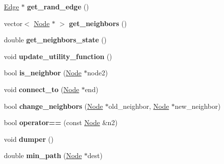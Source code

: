 \begin{DoxyCompactItemize}
\item 
\hypertarget{classNode_ad82b8e548dbe9ac08da97d91cfcd5504}{}\hyperlink{classEdge}{Edge} $\ast$ {\bfseries get\+\_\+rand\+\_\+edge} ()\label{classNode_ad82b8e548dbe9ac08da97d91cfcd5504}

\item 
\hypertarget{classNode_a66879b4a454db6b9ae77eb6a2d00f838}{}vector$<$ \hyperlink{classNode}{Node} $\ast$ $>$ {\bfseries get\+\_\+neighbors} ()\label{classNode_a66879b4a454db6b9ae77eb6a2d00f838}

\item 
\hypertarget{classNode_aac4cc347fc2c7e0ab05e6d5238e11c92}{}double {\bfseries get\+\_\+neighbors\+\_\+state} ()\label{classNode_aac4cc347fc2c7e0ab05e6d5238e11c92}

\item 
\hypertarget{classNode_a71cb643a85948da88e39b93f7cfba11b}{}void {\bfseries update\+\_\+utility\+\_\+function} ()\label{classNode_a71cb643a85948da88e39b93f7cfba11b}

\item 
\hypertarget{classNode_a4350c87c78c07d38cac119ab37a84668}{}bool {\bfseries is\+\_\+neighbor} (\hyperlink{classNode}{Node} $\ast$node2)\label{classNode_a4350c87c78c07d38cac119ab37a84668}

\item 
\hypertarget{classNode_a1898c016e7fd43090b584ef82dbffe94}{}void {\bfseries connect\+\_\+to} (\hyperlink{classNode}{Node} $\ast$end)\label{classNode_a1898c016e7fd43090b584ef82dbffe94}

\item 
\hypertarget{classNode_afa26891f04784f67c2b43c65cd9c1462}{}bool {\bfseries change\+\_\+neighbors} (\hyperlink{classNode}{Node} $\ast$old\+\_\+neighbor, \hyperlink{classNode}{Node} $\ast$new\+\_\+neighbor)\label{classNode_afa26891f04784f67c2b43c65cd9c1462}

\item 
\hypertarget{classNode_a66f3f9cd7daa221775c73170ef5b2172}{}bool {\bfseries operator==} (const \hyperlink{classNode}{Node} \&n2)\label{classNode_a66f3f9cd7daa221775c73170ef5b2172}

\item 
\hypertarget{classNode_a36f644ae3cde438004bc9c7cc3fd7c31}{}void {\bfseries dumper} ()\label{classNode_a36f644ae3cde438004bc9c7cc3fd7c31}

\item 
\hypertarget{classNode_aa3fa857f0263eede50d8548d358a49a2}{}double {\bfseries min\+\_\+path} (\hyperlink{classNode}{Node} $\ast$dest)\label{classNode_aa3fa857f0263eede50d8548d358a49a2}


\end{DoxyCompactItemize}
